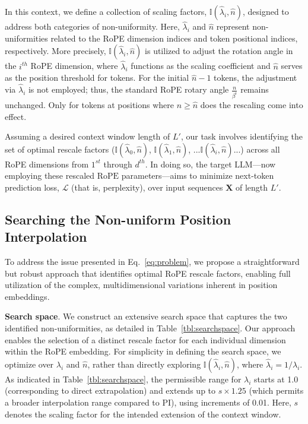 In this context, we define a collection of scaling factors, $\mathbb{I}(\hat{\lambda}_{i},\hat{n})$, designed to address both categories of non-uniformity. Here, $\hat{\lambda}_{i}$ and $\hat{n}$ represent non-uniformities related to the RoPE dimension indices and token positional indices, respectively. More precisely, $\mathbb{I}(\hat{\lambda}_{i},\hat{n})$ is utilized to adjust the rotation angle in the $i^{th}$ RoPE dimension, where $\hat{\lambda}_{i}$ functions as the scaling coefficient and $\hat{n}$ serves as the position threshold for tokens. For the initial $\hat{n}-1$ tokens, the adjustment via $\hat{\lambda}_{i}$ is not employed; thus, the standard RoPE rotary angle $\frac{n}{\beta^i}$ remains unchanged. Only for tokens at positions where $n \ge \hat{n}$ does the rescaling come into effect.

Assuming a desired context window length of $L'$, our task involves identifying the set of optimal rescale factors ($\mathbb{I}(\hat{\lambda}_{0},\hat{n})$, $\mathbb{I}(\hat{\lambda}_{1},\hat{n})$, ...$\mathbb{I}(\hat{\lambda}_{i},\hat{n})$...) across all RoPE dimensions from $1^{st}$ through $d^{th}$. In doing so, the target $\text{LLM}$—now employing these rescaled $\text{RoPE}$ parameters—aims to minimize next-token prediction loss, $\mathcal{L}$ (that is, perplexity), over input sequences $\mathbf{X}$ of length $L'$.

\subsection{Searching the Non-uniform Position Interpolation}

To address the issue presented in Eq.~\ref{eq:problem}, we propose a straightforward but robust approach that identifies optimal RoPE rescale factors, enabling full utilization of the complex, multidimensional variations inherent in position embeddings.

\textbf{Search space}. We construct an extensive search space that captures the two identified non-uniformities, as detailed in Table~\ref{tbl:searchspace}. Our approach enables the selection of a distinct rescale factor for each individual dimension within the RoPE embedding. For simplicity in defining the search space, we optimize over $\lambda_i$ and $\hat{n}$, rather than directly exploring $\mathbb{I}(\hat{\lambda}_{i},\hat{n})$, where $\hat{\lambda}_{i}=1/\lambda_i$. As indicated in Table~\ref{tbl:searchspace}, the permissible range for $\lambda_i$ starts at 1.0 (corresponding to direct extrapolation) and extends up to $s\times1.25$ (which permits a broader interpolation range compared to PI), using increments of 0.01. Here, $s$ denotes the scaling factor for the intended extension of the context window.

